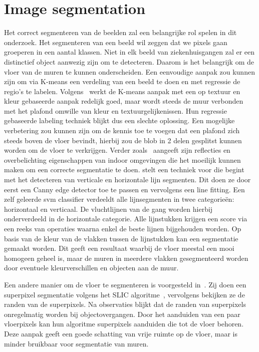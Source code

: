     \section{Image segmentation}\label{sec:image_segmentation}
        Het correct segmenteren van de beelden zal een belangrijke rol spelen in dit onderzoek.
        Het segmenteren van een beeld wil zeggen dat we pixels gaan groeperen in een aantal klassen.
        Niet in elk beeld van ziekenhuisgangen zal er een distinctief object aanwezig zijn om te detecteren. Daarom is het belangrijk om de vloer van
        de muren te kunnen onderscheiden. Een eenvoudige aanpak zou kunnen zijn om via K-means een verdeling van een beeld te doen en met regressie de regio's te labelen.
        Volgens~\cite{zhangwall} werkt de K-means aanpak met een op textuur en kleur gebaseerde aanpak redelijk goed, maar wordt steeds de muur verbonden met het plafond omwille van kleur en textuurgelijkenissen.
        Hun regressie gebaseerde labeling techniek blijkt dus een slechte oplossing.
        Een mogelijke verbetering zou kunnen zijn om de kennis toe te voegen dat een plafond zich steeds boven de vloer bevindt, hierbij zou de blob in 2 delen gesplitst kunnen worden om de vloer te verkrijgen.
        Verder zoals~\cite{Li2010} aangeeft zijn reflecties en overbelichting eigenschappen van indoor omgevingen die het moeilijk kunnen maken om
        een correcte segmentatie te doen.
        \cite{Li2010} stelt een techniek voor die begint met het detecteren van verticale en horizontale lijn segmenten. Dit doen ze door eerst een Canny edge detector\cite{Canny} toe te passen en vervolgens een line fitting.
        Een zelf geleerde \gls{svm} classifier verdeeldt alle lijnsegmenten in twee categorie\"{e}n: horizontaal en verticaal. De vluchtlijnen van de gang worden hierbij onderverdeeld in de horizontale categorie.
        Alle lijnstukken krijgen een score via een reeks van operaties waarna enkel de beste lijnen bijgehouden worden. Op basis van de kleur van de vlakken tussen de lijnstukken kan een segmentatie gemaakt worden.
        Dit geeft een resultaat waarbij de vloer meestal een mooi homogeen geheel is, maar de muren in meerdere vlakken gesegmenteerd worden door eventuele kleurverschillen en objecten aan de muur.
        
        Een andere manier om de vloer te segmenteren is voorgesteld in~\cite{Rodriguez-Telles2013}. Zij doen een superpixel segmentatie volgens het SLIC algoritme~\cite{slic}, vervolgens bekijken ze de randen van de superpixels.
        Na observaties blijkt dat de randen van superpixels onregelmatig worden bij objectovergangen. Door het aanduiden van een paar vloerpixels kan hun algoritme superpixels aanduiden die tot de vloer behoren.
        Deze aanpak geeft een goede schatting van vrije ruimte op de vloer, maar is minder bruikbaar voor segmentatie van muren.

